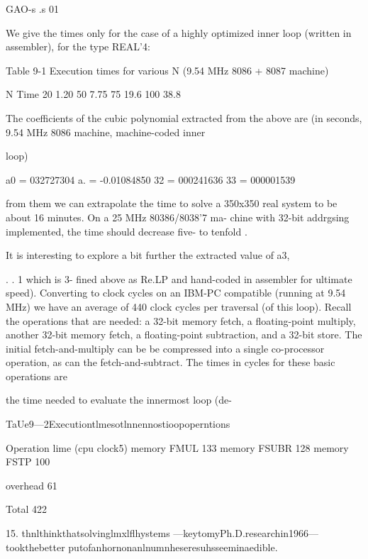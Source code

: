 {{{{{{{{GAO-s
.s
01

We give the times only for the case of a highly optimized inner
loop (written in assembler), for the type REAL'4:

 

Table 9-1 Execution times for various N (9.54 MHz 8086 + 8087 machine)

 

N Time
20 1.20
50 7.75
75 19.6
100 38.8

 

 

 

The coefficients of the cubic polynomial extracted from the above
are (in seconds, 9.54 MHz 8086 machine, machine-coded inner

loop)

a0 = 032727304
a. = -0.01084850
32 = 000241636
33 = 000001539

from them we can extrapolate the time to solve a 350x350 real
system to be about 16 minutes. On a 25 MHz 80386/8038'7 ma-
chine with 32-bit addrgsing implemented, the time should
decrease five- to tenfold .

It is interesting to explore a bit further the extracted value of a3,

. . 1
which is 3-
fined above as Re.LP and hand-coded in assembler for ultimate
speed). Converting to clock cycles on an IBM-PC compatible
(running at 9.54 MHz) we have an average of 440 clock cycles per
traversal (of this loop). Recall the operations that are needed: a
32-bit memory fetch, a floating-point multiply, another 32-bit
memory fetch, a floating-point subtraction, and a 32-bit store.
The initial fetch-and-multiply can be be compressed into a single
co-processor operation, as can the fetch-and-subtract. The times
in cycles for these basic operations are

the time needed to evaluate the innermost loop (de-

TaUe9—2Executiontlmesotlnnennostioopoperntions

 

Operation lime (cpu clock5)
memory FMUL 133
memory FSUBR 128
memory FSTP 100

overhead 61

 

Total 422

 

 

 

 

15. thnlthinkthatsolvinglmxlflhystems —keytomyPh.D.researchin1966— tookthebetter
putofanhornonanlnumnheseresuhsseeminaedible.

}}}}}}}}
